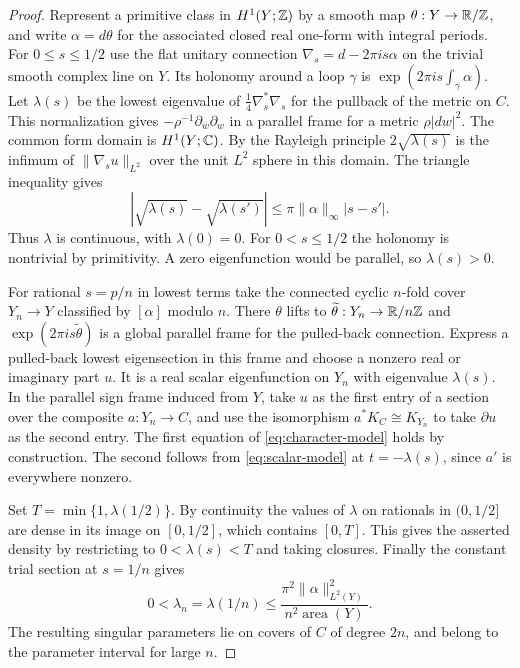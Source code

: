 \begin{proof}
Represent a primitive class in $H^1(Y;\mathbb Z)$ by a smooth map
$\theta:Y\to\mathbb R/\mathbb Z$, and write $\alpha=d\theta$ for the associated
closed real one-form with integral periods. For $0\le s\le1/2$ use
the flat unitary connection $\nabla_s=d-2\pi i s\alpha$ on the trivial
smooth complex line on $Y$. Its holonomy around a loop $\gamma$ is
$\exp(2\pi i s\int_\gamma\alpha)$. Let $\lambda(s)$ be the lowest
eigenvalue of $\tfrac14\nabla_s^*\nabla_s$ for the pullback of the
metric on $C$. This normalization gives
$-\rho^{-1}\partial_{\bar w}\partial_w$ in a parallel frame for a
metric $\rho|dw|^2$. The common form domain is $H^1(Y;\mathbb C)$. By the
Rayleigh principle $2\sqrt{\lambda(s)}$ is the infimum of
$\|\nabla_s u\|_{L^2}$ over the unit $L^2$ sphere in this domain.
The triangle inequality gives
\[
 |\sqrt{\lambda(s)}-\sqrt{\lambda(s')}|
 \le \pi\|\alpha\|_\infty |s-s'| .
\]
Thus $\lambda$ is continuous, with $\lambda(0)=0$. For
$0<s\le1/2$ the holonomy is nontrivial by primitivity. A
zero eigenfunction would be parallel, so $\lambda(s)>0$.

For rational $s=p/n$ in lowest terms take the connected cyclic
$n$-fold cover $Y_n\to Y$ classified by $[\alpha]$ modulo $n$.
There $\theta$ lifts to $\widetilde\theta:Y_n\to\mathbb R/n\mathbb Z$ and
$\exp(2\pi i s\widetilde\theta)$ is a global parallel frame for the
pulled-back connection. Express a pulled-back lowest eigensection in
this frame and choose a nonzero real or imaginary part $u$. It is a
real scalar eigenfunction on $Y_n$ with eigenvalue $\lambda(s)$.
In the parallel sign frame induced from $Y$, take $u$ as the first
entry of a section over the composite $a:Y_n\to C$, and use the
isomorphism $a^*K_C\cong K_{Y_n}$ to take $\partial u$ as the second
entry. The first equation of \eqref{eq:character-model} holds by
construction. The second follows from \eqref{eq:scalar-model} at
$t=-\lambda(s)$, since $a'$ is everywhere nonzero.

Set $T=\min\{1,\lambda(1/2)\}$. By continuity the values of $\lambda$
on rationals in $(0,1/2]$ are dense in its image on $[0,1/2]$,
which contains $[0,T]$. This gives the asserted density by restricting
to $0<\lambda(s)<T$ and taking closures. Finally the constant trial
section at $s=1/n$ gives
\[
 0<\lambda_n=\lambda(1/n)
 \le \frac{\pi^2\|\alpha\|_{L^2(Y)}^2}
          {n^2\operatorname{area}(Y)} .
\]
The resulting singular parameters lie on covers of $C$ of degree
$2n$, and belong to the parameter interval for large $n$.
\end{proof}

